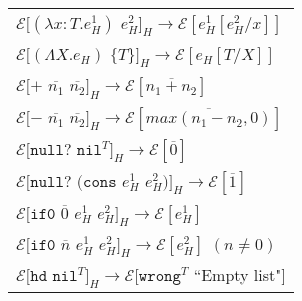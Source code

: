 \begin{figure}[p]
\centering
\begin{tabular}{l}
\vspace{5pt}

$\mathscr{E}[(\lambda x:T.e_{H}^{1})$ $e_{H}^{2}]_{H}\rightarrow\mathscr{E}[e_{H}^{1}[e_{H}^{2}/x]]$ \\

\vspace{5pt}

$\mathscr{E}[(\Lambda X.e_{H})$ $\lbrace T\rbrace]_{H}\rightarrow\mathscr{E}[e_{H}[T/X]]$ \\

\vspace{5pt}

$\mathscr{E}[+$ $\overline{n_{1}}$ $\overline{n_{2}}]_{H}\rightarrow\mathscr{E}[\overline{n_{1}+n_{2}}]$ \\

\vspace{5pt}

$\mathscr{E}[-$ $\overline{n_{1}}$ $\overline{n_{2}}]_{H}\rightarrow\mathscr{E}[\overline{max(n_{1}-n_{2},0)}]$ \\

\vspace{5pt}

$\mathscr{E}[\mathtt{null?}$ $\mathtt{nil}^{T}]_{H}\rightarrow\mathscr{E}[\overline{0}]$ \\

\vspace{5pt}

$\mathscr{E}[\mathtt{null?}$ $(\mathtt{cons}$ $e_{H}^{1}$ $e_{H}^{2})]_{H}\rightarrow\mathscr{E}[\overline{1}]$ \\

\vspace{5pt}

$\mathscr{E}[\mathtt{if0}$ $\overline{0}$ $e_{H}^{1}$ $e_{H}^{2}]_{H}\rightarrow\mathscr{E}[e_{H}^{1}]$ \\

\vspace{5pt}

$\mathscr{E}[\mathtt{if0}$ $\overline{n}$ $e_{H}^{1}$ $e_{H}^{2}]_{H}\rightarrow\mathscr{E}[e_{H}^{2}]$ $(n\neq0)$ \\

\vspace{5pt}

$\mathscr{E}[\mathtt{hd}$ $\mathtt{nil}^{T}]_{H}\rightarrow\mathscr{E}[\mathtt{wrong}^{T}$ ``Empty list"$]$ \\


\end{tabular}
\end{figure}

